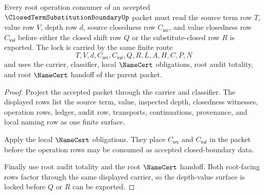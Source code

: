 \begin{theorem}
\label{thm:closed-term-substitution-boundary-root-depth-value-lock}
Every root operation consumer of an accepted $\ClosedTermSubstitutionBoundaryUp$ packet must read the source term row $T$, value row $V$, depth row $d$, source closedness row $C_{\mathsf{src}}$, and value closedness row $C_{\mathsf{val}}$ before either the closed shift row $Q$ or the substitute-closed row $R$ is exported. The lock is carried by the same finite route
$$
T,V,d,C_{\mathsf{src}},C_{\mathsf{val}},Q,R,L,A,H,C,P,N
$$
and uses the carrier, classifier, local $\NameCert$ obligations, root audit totality, and root $\NameCert$ handoff of the parent packet.
\end{theorem}
\begin{proof}
Project the accepted packet through the carrier and classifier. The displayed rows list the source term, value, inspected depth, closedness witnesses, operation rows, ledger, audit row, transports, continuations, provenance, and local naming row as one finite surface.

Apply the local $\NameCert$ obligations. They place $C_{\mathsf{src}}$ and $C_{\mathsf{val}}$ in the packet before the operation rows may be consumed as accepted closed-boundary data.

Finally use root audit totality and the root $\NameCert$ handoff. Both root-facing rows factor through the same displayed carrier, so the depth-value surface is locked before $Q$ or $R$ can be exported.
\end{proof}

